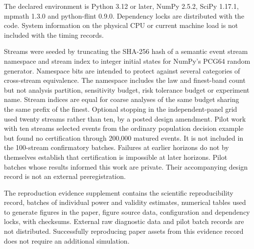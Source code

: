 The declared environment is Python 3.12 or later, NumPy 2.5.2, SciPy 1.17.1, mpmath 1.3.0 and python-flint 0.9.0. Dependency locks are distributed with the code. System information on the physical CPU or current machine load is not included with the timing records.

Streams were seeded by truncating the SHA-256 hash of a semantic event stream namespace and stream index to integer initial states for NumPy's PCG64 random generator. Namespace bits are intended to protect against several categories of cross-stream equivalence. The namespace includes the law and finest-band count but not analysis partition, sensitivity budget, risk tolerance budget or experiment name. Stream indices are equal for coarse analyses of the same budget sharing the same prefix of the finest. Optional stopping in the independent-panel grid used twenty streams rather than ten, by a posted design amendment. Pilot work with ten streams selected events from the ordinary population decision example but found no certification through 200,000 matured events. It is not included in the 100-stream confirmatory batches. Failures at earlier horizons do not by themselves establish that certification is impossible at later horizons. Pilot batches whose results informed this work are private. Their accompanying design record is not an external preregistration.

The reproduction evidence supplement contains the scientific reproducibility record, batches of individual power and validity estimates, numerical tables used to generate figures in the paper, figure source data, configuration and dependency locks, with checksums. External raw diagnostic data and pilot batch records are not distributed. Successfully reproducing paper assets from this evidence record does not require an additional simulation.
